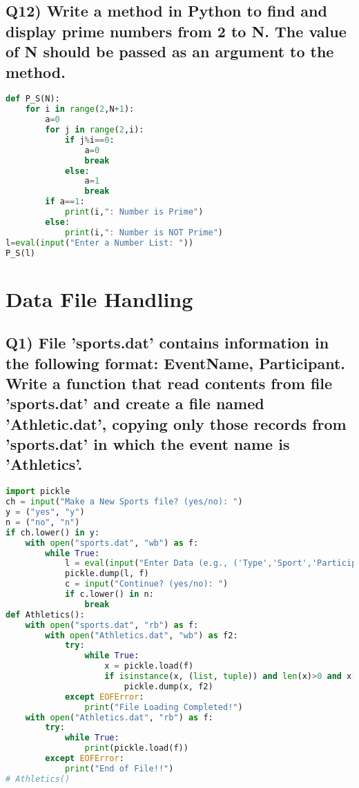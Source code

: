 \documentclass{article}
\begin{document}
\subsection*{Q12) Write a method in Python to find and display prime numbers from 2 to N. The value of N should be passed as an argument to the method.}
\begin{lstlisting}[language=Python]
def P_S(N):
    for i in range(2,N+1):
        a=0
        for j in range(2,i):
            if j%i==0:
                a=0
                break
            else:
                a=1
                break
        if a==1:
            print(i,": Number is Prime")
        else:
            print(i,": Number is NOT Prime")
l=eval(input("Enter a Number List: "))
P_S(l)
\end{lstlisting}

\section{Data File Handling}

\subsection*{Q1) File 'sports.dat' contains information in the following format: EventName, Participant. Write a function that read contents from file 'sports.dat' and create a file named 'Athletic.dat', copying only those records from 'sports.dat' in which the event name is 'Athletics'.}
\begin{lstlisting}[language=Python]
import pickle
ch = input("Make a New Sports file? (yes/no): ")
y = ("yes", "y")
n = ("no", "n")
if ch.lower() in y:
    with open("sports.dat", "wb") as f:
        while True:
            l = eval(input("Enter Data (e.g., ('Type','Sport','Participant')): "))
            pickle.dump(l, f)
            c = input("Continue? (yes/no): ")
            if c.lower() in n:
                break
def Athletics():
    with open("sports.dat", "rb") as f:
        with open("Athletics.dat", "wb") as f2:
            try:
                while True:
                    x = pickle.load(f)
                    if isinstance(x, (list, tuple)) and len(x)>0 and x[0].lower() == "athletics":
                        pickle.dump(x, f2)
            except EOFError:
                print("File Loading Completed!")
    with open("Athletics.dat", "rb") as f:
        try:
            while True:
                print(pickle.load(f))
        except EOFError:
            print("End of File!!")
# Athletics()
\end{lstlisting}
\end{document}
